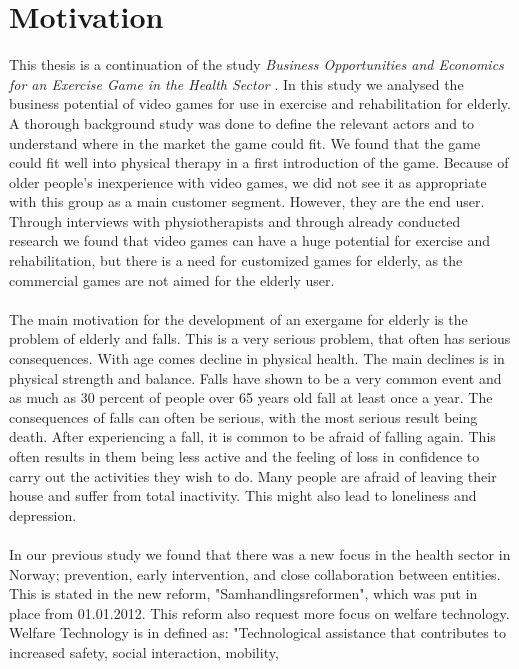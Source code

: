 \chapter{Motivation}
This thesis is a continuation of the study \emph{Business Opportunities and Economics for an Exercise Game in the Health Sector} \cite{project}. In this study we analysed the business potential of video games for use in exercise and rehabilitation for elderly. A thorough background study was done to define the relevant actors and to understand where in the market the game could fit. We found that the game could fit well into physical therapy in a first introduction of the game. Because of older people's inexperience with video games, we did not see it as appropriate with this group as a main customer segment. However, they are the end user. Through interviews with physiotherapists and through already conducted research we found that video games can have a huge potential  for exercise and rehabilitation, but there is a need for customized games for elderly, as the commercial games are not aimed for the elderly user. \\ \\
The main motivation for the development of an exergame for elderly is the problem of elderly and falls. This is a very serious problem, that often has serious consequences. With age comes decline in physical health. The main declines is in physical strength and balance. Falls have shown to be a very common event and as much as 30 percent of people over 65 years old fall at least once a year. The consequences of falls can often be serious, with the most serious result being death. After experiencing a fall, it is common to be afraid of falling again. This often results in them being less active and the feeling of loss in confidence to carry out the activities they wish to do. Many people are afraid of leaving their house and suffer from total inactivity. This might also lead to loneliness and depression. \\ \\
In our previous study \cite{project} we found that there was a new focus in the health sector in Norway; prevention, early intervention, and close collaboration between entities. This is stated in the new reform, "Samhandlingsreformen", which was put in place from 01.01.2012. This reform also request more focus on welfare technology. Welfare Technology is in \cite{welfare} defined as: "Technological assistance that contributes to increased safety, social interaction, mobility,

